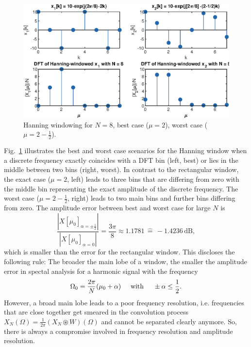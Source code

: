 \documentclass[11pt,a4paper,DIV=12]{scrartcl}
\begin{document}
\begin{figure}
		\centering
		\includegraphics[]{graphics/DFTbestworstcase_HannWin}
		\caption{Hanning windowing for $N=8$, best case ($\mu=2$), worst case ($\mu=2-\frac{1}{2}$).}
		\label{DFTbestworstcase_HannWin}
\end{figure}

Fig.~\ref{DFTbestworstcase_HannWin} illustrates the best and worst case
scenarios for the Hanning window when a discrete frequency exactly coincides
with a DFT bin (left, best) or lies in the middle between two bins (right, worst).
%
In contrast to the rectangular window, the exact case ($\mu=2$, left) leads to
three bins that are differing from zero with the middle bin representing the
exact amplitude of the discrete frequency.
%
The worst case ($\mu=2-\frac{1}{2}$, right) leads to two main bins and further
bins differing from zero.
%
The amplitude error between best and worst case for large $N$ is
%
\begin{equation}
\frac{\left|X[\mu_0]_{\alpha=\pm\frac{1}{2}}\right|}{\left|X[\mu_0]_{\alpha=0}\right|}=\frac{3\pi}{8}\approx1.1781\,\hat{=}\,-1.4236\,\text{dB},
\end{equation}
%
which is smaller than the error for the rectangular window.
%
This discloses the following rule: The broader the main lobe of a window,
the smaller the amplitude error in spectal analysis for a harmonic signal with
the frequency
%
\begin{equation}
\Omega_0=\frac{2\pi}{N}(\mu_0+\alpha) \hspace{5mm} \text{with} \hspace{5mm} \pm\alpha\leq\frac{1}{2}.
\end{equation}
%
However, a broad main lobe leads to a poor frequency resolution, i.e.
frequencies that are close together get smeared in the convolution process
$X_N(\Omega)=\frac{1}{2\pi}(X_N\circledast W)(\Omega)$ and cannot be separated
clearly anymore. So, there is always a compromise involved in frequency
resolution and amplitude resolution.
\end{document}
